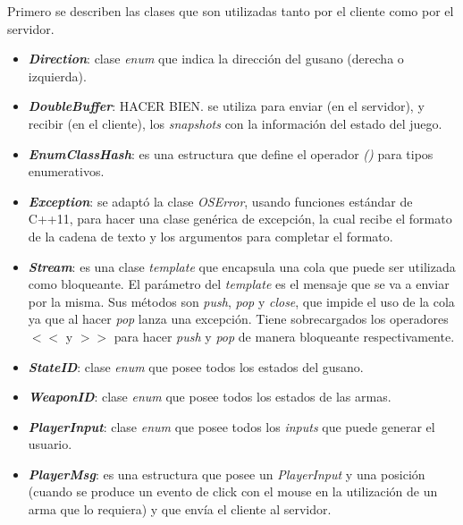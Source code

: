 Primero se describen las clases que son utilizadas tanto por el cliente como por el servidor.

\begin{itemize}
	\item \textbf{\textit{Direction}}: clase \textit{enum} que indica la dirección del gusano (derecha o izquierda).
	
	\item \textbf{\textit{DoubleBuffer}}: HACER BIEN. se utiliza para enviar (en el servidor), y recibir (en el cliente), los \textit{snapshots} con la información del estado del juego.
	
	\item \textbf{\textit{EnumClassHash}}: es una estructura que define el operador \textit{()} para tipos enumerativos.
	
	\item \textbf{\textit{Exception}}: se adaptó la clase \textit{OSError}, usando funciones estándar de C++11, para hacer una clase genérica de excepción, la cual recibe el formato de la cadena de texto y los argumentos para completar el formato.
	
	\item \textbf{\textit{Stream}}: es una clase \textit{template} que encapsula una cola que puede ser utilizada como bloqueante. El parámetro del \textit{template} es el mensaje que se va a enviar por la misma. Sus métodos son \textit{push}, \textit{pop} y \textit{close}, que impide el uso de la cola ya que al hacer \textit{pop} lanza una excepción. Tiene sobrecargados los operadores $<<$ y $>>$ para hacer \textit{push} y \textit{pop} de manera bloqueante respectivamente.
	
	\item \textbf{\textit{StateID}}: clase \textit{enum} que posee todos los estados del gusano.
	
	\item \textbf{\textit{WeaponID}}: clase \textit{enum} que posee todos los estados de las armas.
	
	\item \textbf{\textit{PlayerInput}}: clase \textit{enum} que posee todos los \textit{inputs} que puede generar el usuario.
	
	\item \textbf{\textit{PlayerMsg}}: es una estructura que posee un \textit{PlayerInput} y una posición (cuando se produce un evento de click con el mouse en la utilización de un arma que lo requiera) y que envía el cliente al servidor.
	

\end{itemize}
